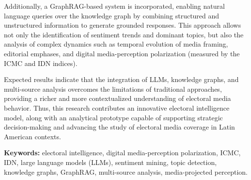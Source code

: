 Additionally, a GraphRAG-based system is incorporated, enabling natural language queries over the knowledge graph by combining structured and unstructured information to generate grounded responses. This approach allows not only the identification of sentiment trends and dominant topics, but also the analysis of complex dynamics such as temporal evolution of media framing, editorial emphases, and digital media-perception polarization (measured by the ICMC and IDN indices).

Expected results indicate that the integration of LLMs, knowledge graphs, and multi-source analysis overcomes the limitations of traditional approaches, providing a richer and more contextualized understanding of electoral media behavior. Thus, this research contributes an innovative electoral intelligence model, along with an analytical prototype capable of supporting strategic decision-making and advancing the study of electoral media coverage in Latin American contexts.

\textbf{Keywords: } electoral intelligence, digital media-perception polarization, ICMC, IDN, large language models (LLMs), sentiment mining, topic detection, knowledge graphs, GraphRAG, multi-source analysis, media-projected perception.